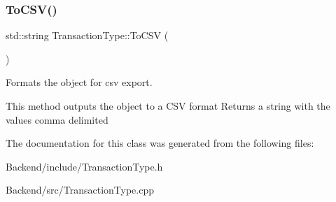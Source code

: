 \subsubsection{\texorpdfstring{To\+C\+S\+V()}{ToCSV()}}
{\footnotesize\ttfamily std\+::string Transaction\+Type\+::\+To\+C\+SV (\begin{DoxyParamCaption}{ }\end{DoxyParamCaption})}



Formats the object for csv export. 

This method outputs the object to a C\+SV format Returns a string with the values comma delimited 

The documentation for this class was generated from the following files\+:\begin{DoxyCompactItemize}
\item 
Backend/include/Transaction\+Type.\+h\item 
Backend/src/Transaction\+Type.\+cpp\end{DoxyCompactItemize}
